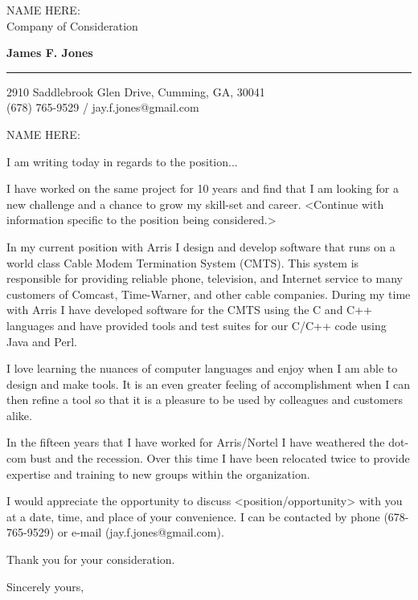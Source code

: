 \documentclass{letter} %
\begin{document}
\signature{James F. Jones}           %
\longindentation=0pt                       %
\let\raggedleft\raggedright                %
 
 
\begin{letter}{NAME HERE:\\
Company of Consideration
}


\begin{flushleft}
{\large\bf James F. Jones}
\end{flushleft}
\medskip\hrule height 1pt
\begin{flushright}
\hfill 2910 Saddlebrook Glen Drive, Cumming, GA, 30041\\
\hfill (678) 765-9529 / jay.f.jones@gmail.com
\end{flushright} 
\vfill %

\opening{NAME HERE:} 
 
\noindent 
I am writing today in regards to the position...

\noindent I have worked on the same project for 10 years and find
that I am looking for a new challenge and a chance to grow my 
skill-set and career.   <Continue with information specific to the 
position being considered.>


In my current position with Arris I design and develop software
that runs on a world class Cable Modem Termination System (CMTS).  This
system is responsible for providing reliable phone, television, and Internet
service to many customers of Comcast, Time-Warner, and other 
cable companies. During my time with Arris I have developed software
for the CMTS using the C and C++ languages and have provided tools and test 
suites for our C/C++ code using Java and Perl.

I love learning the nuances of computer languages and enjoy 
when I am able to design and make tools.  It is an even greater
feeling of accomplishment when I can then refine a tool so that it is a
pleasure to be used by colleagues and customers alike.

In the fifteen years that I have worked for Arris/Nortel I have weathered 
the dot-com bust and the recession.  Over this time I have been relocated twice 
to provide expertise and training to new groups within the organization. 
 
\noindent I would appreciate the opportunity to discuss <position/opportunity>
with you at a date, time, and place of your
convenience. I can be contacted by phone (678-765-9529) or e-mail (jay.f.jones@gmail.com).

\noident Thank you for your consideration.
 
\closing{Sincerely yours,} 


 

\end{letter}
 
\end{document}
